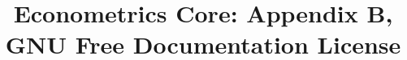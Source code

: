 \documentclass{tex/tufte-handout}
\title{Econometrics Core: Appendix B, GNU Free Documentation License}
\begin{document}
\maketitle
\bigskip

\end{document}
